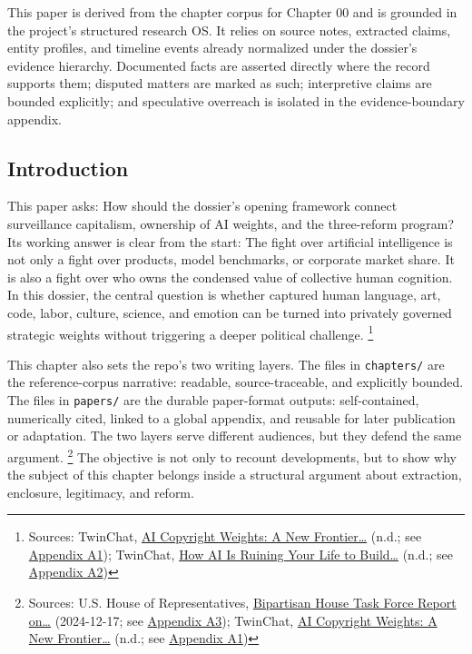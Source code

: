 \documentclass[
  american,
  11pt,
  letterpaper,
]{article}
\begin{document}
This paper is derived from the chapter corpus for Chapter 00 and is
grounded in the project's structured research OS. It relies on source
notes, extracted claims, entity profiles, and timeline events already
normalized under the dossier's evidence hierarchy. Documented facts are
asserted directly where the record supports them; disputed matters are
marked as such; interpretive claims are bounded explicitly; and
speculative overreach is isolated in the evidence-boundary appendix.

\subsection{Introduction}\label{introduction}

This paper asks: How should the dossier's opening framework connect
surveillance capitalism, ownership of AI weights, and the three-reform
program? Its working answer is clear from the start: The fight over
artificial intelligence is not only a fight over products, model
benchmarks, or corporate market share. It is also a fight over who owns
the condensed value of collective human cognition. In this dossier, the
central question is whether captured human language, art, code, labor,
culture, science, and emotion can be turned into privately governed
strategic weights without triggering a deeper political challenge.
\footnote{Sources: TwinChat,
  \href{https://medium.com/twinchat/ai-copyright-weights-a-new-frontier-in-intellectual-property-law-d8ee1b6c55ee}{AI
  Copyright Weights: A New Frontier\ldots{}} (n.d.; see
  \hyperref[appendix-a1-ai-copyright-weights-a-new-frontier-in-intellectual-property-law]{Appendix
  A1}); TwinChat,
  \href{https://medium.com/twinchat/how-ai-is-ruining-your-life-to-build-an-empire-8b6d02e55bc9}{How
  AI Is Ruining Your Life to Build\ldots{}} (n.d.; see
  \hyperref[appendix-a2-how-ai-is-ruining-your-life-to-build-an-empire]{Appendix
  A2})}

This chapter also sets the repo's two writing layers. The files in
\texttt{chapters/} are the reference-corpus narrative: readable,
source-traceable, and explicitly bounded. The files in \texttt{papers/}
are the durable paper-format outputs: self-contained, numerically cited,
linked to a global appendix, and reusable for later publication or
adaptation. The two layers serve different audiences, but they defend
the same argument. \footnote{Sources: U.S. House of Representatives,
  \href{https://www.speaker.gov/wp-content/uploads/2024/12/AI-Task-Force-Report-FINAL.pdf}{Bipartisan
  House Task Force Report on\ldots{}} (2024-12-17; see
  \hyperref[appendix-a3-bipartisan-house-task-force-report-on-artificial-intelligence]{Appendix
  A3}); TwinChat,
  \href{https://medium.com/twinchat/ai-copyright-weights-a-new-frontier-in-intellectual-property-law-d8ee1b6c55ee}{AI
  Copyright Weights: A New Frontier\ldots{}} (n.d.; see
  \hyperref[appendix-a1-ai-copyright-weights-a-new-frontier-in-intellectual-property-law]{Appendix
  A1})} The objective is not only to recount developments, but to show
why the subject of this chapter belongs inside a structural argument
about extraction, enclosure, legitimacy, and reform.
\end{document}
